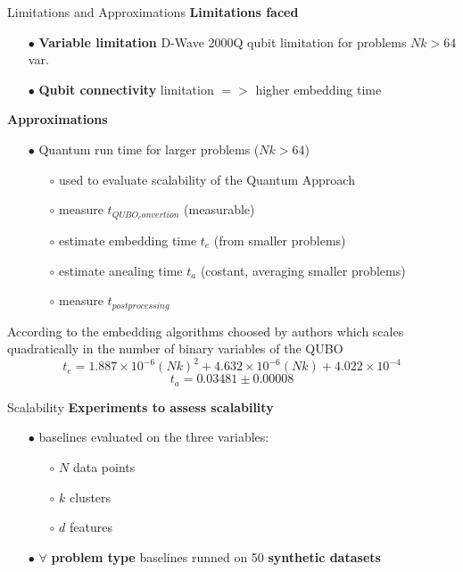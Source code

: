 		\begin{frame}[allowframebreaks]{Limitations and Approximations}
			\textbf{Limitations faced}
			\begin{itemize}
				\item[$\bullet$] \textbf{Variable limitation} D-Wave 2000Q qubit limitation for problems $Nk > 64$ var.
				\item[$\bullet$] \textbf{Qubit connectivity} limitation $=>$ higher embedding time
			\end{itemize}
			\textbf{Approximations}
			\begin{itemize}
				\item[$\bullet$] Quantum run time for larger problems ($Nk > 64$)
				\begin{itemize}
					\item[$\circ$] used to evaluate scalability of the Quantum Approach
					\item[$\circ$] measure $t_{QUBO_convertion}$ (measurable)
					\item[$\circ$] estimate embedding time $t_{e}$ (from smaller problems)
					\item[$\circ$] estimate anealing time $t_{a}$ (costant, averaging smaller problems) 
					\item[$\circ$] measure $t_{postprocessing}$
				\end{itemize} 
			\end{itemize}
			According to the embedding algorithms choosed by authors which scales quadratically in the number of binary variables of the QUBO
			\begin{equation}
				t_{e} = 1.887 \times 10^{-6}(Nk)^2 
				+ 4.632 \times 10^{-6}(Nk)
				+ 4.022 \times 10^{-4}
			\end{equation}
			\begin{equation}
				t_{a} = 0.03481 \pm 0.00008
			\end{equation}
		\end{frame}

		\begin{frame}{Scalability}
			\textbf{Experiments to assess scalability}
			\begin{itemize}
				\item[$\bullet$] baselines evaluated on the three variables:
				\begin{itemize}
					\item[$\circ$] $N$ data points  					
					\item[$\circ$] $k$ clusters
					\item[$\circ$] $d$ features 
				\end{itemize}
				\item[$\bullet$] $\forall$ \textbf{problem type} baselines runned on 50 \textbf{synthetic datasets}
			\end{itemize}
		\end{frame}

